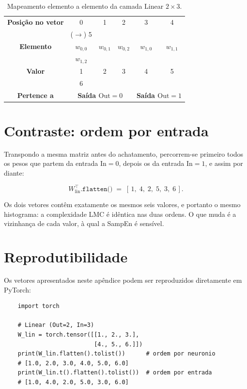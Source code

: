 \begin{table}[H]
\centering
\caption{Mapeamento elemento a elemento da camada Linear $2 \times 3$.}
\label{tab:ap-linear}
\small
\begin{tabular}{cccccc}
\toprule
\textbf{Posição no vetor} & 0 & 1 & 2 & 3 & 4 \\
                          & ($\to$) 5 & & & & \\
\midrule
\textbf{Elemento}      & $w_{0,0}$ & $w_{0,1}$ & $w_{0,2}$ & $w_{1,0}$ & $w_{1,1}$ \\
                       & $w_{1,2}$ & & & & \\
\midrule
\textbf{Valor}         & 1 & 2 & 3 & 4 & 5 \\
                       & 6 & & & & \\
\midrule
\textbf{Pertence a}    & \multicolumn{3}{c}{\textbf{Saída $\mathrm{Out}=0$}} & \multicolumn{2}{c}{\textbf{Saída $\mathrm{Out}=1$}} \\
\bottomrule
\end{tabular}
\end{table}

\section{Contraste: ordem por entrada}
\label{sec:ap-transposicao}

Transpondo a mesma matriz antes do achatamento, percorrem-se primeiro todos os
pesos que partem da entrada $\mathrm{In}=0$, depois os da entrada
$\mathrm{In}=1$, e assim por diante:

\begin{equation}
  W_{\text{lin}}^{\top}.\texttt{flatten()} \;=\; [\,1,\;4,\;2,\;5,\;3,\;6\,].
\end{equation}

Os dois vetores contêm exatamente os mesmos seis valores, e portanto o mesmo
histograma: a complexidade LMC é idêntica nas duas ordens. O que muda é a
vizinhança de cada valor, à qual a SampEn é sensível.

\section{Reprodutibilidade}
\label{sec:ap-reproducao}

Os vetores apresentados neste apêndice podem ser reproduzidos diretamente em
PyTorch:

\begin{verbatim}
    import torch

    # Linear (Out=2, In=3)
    W_lin = torch.tensor([[1., 2., 3.],
                          [4., 5., 6.]])
    print(W_lin.flatten().tolist())      # ordem por neuronio
    # [1.0, 2.0, 3.0, 4.0, 5.0, 6.0]
    print(W_lin.t().flatten().tolist())  # ordem por entrada
    # [1.0, 4.0, 2.0, 5.0, 3.0, 6.0]
\end{verbatim}
